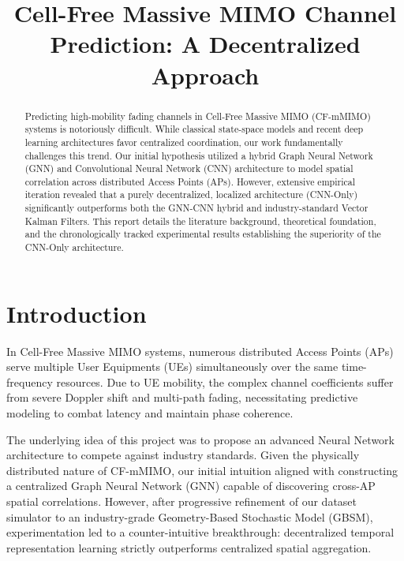 \documentclass[conference]{IEEEtran}
\begin{document}
\title{Cell-Free Massive MIMO Channel Prediction: A Decentralized Approach}

\author{
}

\maketitle

\begin{abstract}
Predicting high-mobility fading channels in Cell-Free Massive MIMO (CF-mMIMO) systems is notoriously difficult. While classical state-space models and recent deep learning architectures favor centralized coordination, our work fundamentally challenges this trend. Our initial hypothesis utilized a hybrid Graph Neural Network (GNN) and Convolutional Neural Network (CNN) architecture to model spatial correlation across distributed Access Points (APs). However, extensive empirical iteration revealed that a purely decentralized, localized architecture (CNN-Only) significantly outperforms both the GNN-CNN hybrid and industry-standard Vector Kalman Filters. This report details the literature background, theoretical foundation, and the chronologically tracked experimental results establishing the superiority of the CNN-Only architecture.
\end{abstract}

\section{Introduction}
In Cell-Free Massive MIMO systems, numerous distributed Access Points (APs) serve multiple User Equipments (UEs) simultaneously over the same time-frequency resources. Due to UE mobility, the complex channel coefficients suffer from severe Doppler shift and multi-path fading, necessitating predictive modeling to combat latency and maintain phase coherence.

The underlying idea of this project was to propose an advanced Neural Network architecture to compete against industry standards. Given the physically distributed nature of CF-mMIMO, our initial intuition aligned with constructing a centralized Graph Neural Network (GNN) capable of discovering cross-AP spatial correlations. However, after progressive refinement of our dataset simulator to an industry-grade Geometry-Based Stochastic Model (GBSM), experimentation led to a counter-intuitive breakthrough: decentralized temporal representation learning strictly outperforms centralized spatial aggregation.
\end{document}
